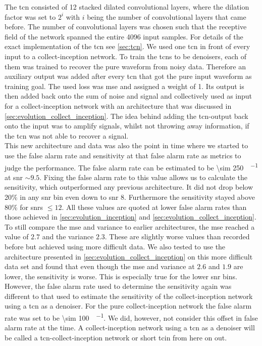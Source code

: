 The \gls{tcn} consisted of 12 stacked dilated convolutional layers, where the dilation factor was set to $2^i$ with $i$ being the number of convolutional layers that came before. The number of convolutional layers was chosen such that the receptive field of the network spanned the entire 4096 input samples. For details of the exact implementation of the \gls{tcn} see \autoref{sec:tcn}. We used one \gls{tcn} in front of every input to a collect-inception network. To train the \gls{tcn}s to be denoisers, each of them was trained to recover the pure waveform from noisy data. Therefore an auxiliary output was added after every \gls{tcn} that got the pure input waveform as training goal. The used loss was \gls{mse} and assigned a weight of 1. Its output is then added back onto the sum of noise and signal and collectively used as input for a collect-inception network with an architecture that was discussed in \autoref{sec:evolution_collect_inception}. The idea behind adding the \gls{tcn}-output back onto the input was to amplify signals, whilst not throwing away information, if the \gls{tcn} was not able to recover a signal.\\
This new architecture and data was also the point in time where we started to use the false alarm rate and sensitivity at that false alarm rate as metrics to judge the performance. The false alarm rate can be estimated to be \SI[per-mode=fraction]{\sim 250}{\samples\per\month} at \gls{snr} $\sim 9.5$. Fixing the false alarm rate to this value allows us to calculate the sensitivity, which outperformed any previous architecture. It did not drop below 20\% in any \gls{snr} bin even down to \gls{snr} 8. Furthermore the sensitivity stayed above 80\% for \gls{snr}s $\leq 12$. All these values are quoted at lower false alarm rates than those achieved in \autoref{sec:evolution_inception} and \autoref{sec:evolution_collect_inception}. To still compare the \gls{mse} and variance to earlier architectures, the \gls{mse} reached a value of $2.7$ and the variance $2.3$. These are slightly worse values than recorded before but achieved using more difficult data. We also tested to use the architecture presented in \autoref{sec:evolution_collect_inception} on this more difficult data set and found that even though the \gls{mse} and variance at $2.6$ and $1.9$ are lower, the sensitivity is worse. This is especially true for the lower \gls{snr} bins. However, the false alarm rate used to determine the sensitivity again was different to that used to estimate the sensitivity of the collect-inception network using a \gls{tcn} as a denoiser. For the pure collect-inception network the false alarm rate was set to be \SI{\sim 100}{\samples\per\month}. We did, however, not consider this offset in false alarm rate at the time. A collect-inception network using a \gls{tcn} as a denoiser will be called a \gls{tcn}-collect-inception network or short \gls{tcin} from here on out.\\
